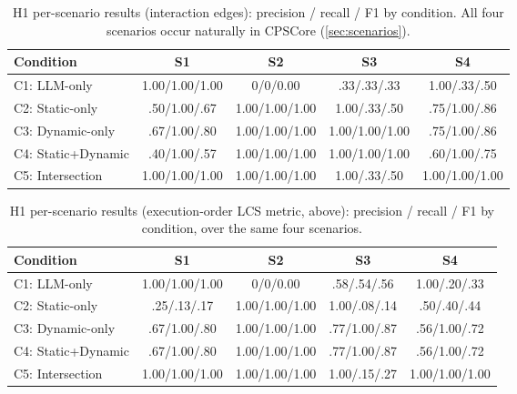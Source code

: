 \begin{table}[htb]
\centering
\caption{H1 per-scenario results (interaction edges): precision / recall
  / F1 by condition. All four scenarios occur naturally in CPSCore
  (\cref{sec:scenarios}).}
\label{tab:h1-per-scenario}
\small
\begin{tabular}{@{} l c c c c @{}}
\toprule
\textbf{Condition} & \textbf{S1} & \textbf{S2} & \textbf{S3} & \textbf{S4} \\
\midrule
C1: LLM-only        & 1.00/1.00/1.00 & 0/0/0.00       & .33/.33/.33 & 1.00/.33/.50 \\
C2: Static-only     & .50/1.00/.67   & 1.00/1.00/1.00 & 1.00/.33/.50 & .75/1.00/.86 \\
C3: Dynamic-only    & .67/1.00/.80   & 1.00/1.00/1.00 & 1.00/1.00/1.00 & .75/1.00/.86 \\
C4: Static+Dynamic  & .40/1.00/.57   & 1.00/1.00/1.00 & 1.00/1.00/1.00 & .60/1.00/.75 \\
C5: Intersection    & 1.00/1.00/1.00 & 1.00/1.00/1.00 & 1.00/.33/.50 & 1.00/1.00/1.00 \\
\bottomrule
\end{tabular}
\end{table}

\begin{table}[htb]
\centering
\caption{H1 per-scenario results (execution-order LCS metric, above): precision /
  recall / F1 by condition, over the same four scenarios.}
\label{tab:h1-per-scenario-seq}
\small
\begin{tabular}{@{} l c c c c @{}}
\toprule
\textbf{Condition} & \textbf{S1} & \textbf{S2} & \textbf{S3} & \textbf{S4} \\
\midrule
C1: LLM-only        & 1.00/1.00/1.00 & 0/0/0.00       & .58/.54/.56 & 1.00/.20/.33 \\
C2: Static-only     & .25/.13/.17    & 1.00/1.00/1.00 & 1.00/.08/.14 & .50/.40/.44 \\
C3: Dynamic-only    & .67/1.00/.80   & 1.00/1.00/1.00 & .77/1.00/.87 & .56/1.00/.72 \\
C4: Static+Dynamic  & .67/1.00/.80   & 1.00/1.00/1.00 & .77/1.00/.87 & .56/1.00/.72 \\
C5: Intersection    & 1.00/1.00/1.00 & 1.00/1.00/1.00 & 1.00/.15/.27 & 1.00/1.00/1.00 \\
\bottomrule
\end{tabular}
\end{table}

